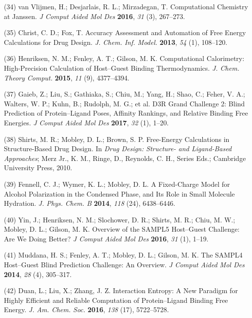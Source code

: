 \documentclass[11pt,notitlepage]{article}
\begin{document}
\leavevmode\hypertarget{ref-1FiDpP1LR}{}%
(34) van Vlijmen, H.; Desjarlais, R. L.; Mirzadegan, T. Computational
Chemistry at Janssen. \emph{J Comput Aided Mol Des} \textbf{2016},
\emph{31} (3), 267--273.

\leavevmode\hypertarget{ref-1BwXH3GFO}{}%
(35) Christ, C. D.; Fox, T. Accuracy Assessment and Automation of Free
Energy Calculations for Drug Design. \emph{J. Chem. Inf. Model.}
\textbf{2013}, \emph{54} (1), 108--120.

\leavevmode\hypertarget{ref-1935a9V0d}{}%
(36) Henriksen, N. M.; Fenley, A. T.; Gilson, M. K. Computational
Calorimetry: High-Precision Calculation of Host--Guest Binding
Thermodynamics. \emph{J. Chem. Theory Comput.} \textbf{2015}, \emph{11}
(9), 4377--4394.

\leavevmode\hypertarget{ref-LWd10vQy}{}%
(37) Gaieb, Z.; Liu, S.; Gathiaka, S.; Chiu, M.; Yang, H.; Shao, C.;
Feher, V. A.; Walters, W. P.; Kuhn, B.; Rudolph, M. G.; et al. D3R Grand
Challenge 2: Blind Prediction of Protein--Ligand Poses, Affinity
Rankings, and Relative Binding Free Energies. \emph{J Comput Aided Mol
Des} \textbf{2017}, \emph{32} (1), 1--20.

\leavevmode\hypertarget{ref-fC0t6Cy1}{}%
(38) Shirts, M. R.; Mobley, D. L.; Brown, S. P. Free-Energy Calculations
in Structure-Based Drug Design. In \emph{Drug Design: Structure- and
Ligand-Based Approaches}; Merz Jr., K. M., Ringe, D., Reynolds, C. H.,
Series Eds.; Cambridge University Press, 2010.

\leavevmode\hypertarget{ref-LOjcxYqt}{}%
(39) Fennell, C. J.; Wymer, K. L.; Mobley, D. L. A Fixed-Charge Model
for Alcohol Polarization in the Condensed Phase, and Its Role in Small
Molecule Hydration. \emph{J. Phys. Chem. B} \textbf{2014}, \emph{118}
(24), 6438--6446.

\leavevmode\hypertarget{ref-BGsUYQln}{}%
(40) Yin, J.; Henriksen, N. M.; Slochower, D. R.; Shirts, M. R.; Chiu,
M. W.; Mobley, D. L.; Gilson, M. K. Overview of the SAMPL5 Host--Guest
Challenge: Are We Doing Better? \emph{J Comput Aided Mol Des}
\textbf{2016}, \emph{31} (1), 1--19.

\leavevmode\hypertarget{ref-GA1AFcUw}{}%
(41) Muddana, H. S.; Fenley, A. T.; Mobley, D. L.; Gilson, M. K. The
SAMPL4 Host--Guest Blind Prediction Challenge: An Overview. \emph{J
Comput Aided Mol Des} \textbf{2014}, \emph{28} (4), 305--317.

\leavevmode\hypertarget{ref-gRfhPG7N}{}%
(42) Duan, L.; Liu, X.; Zhang, J. Z. Interaction Entropy: A New Paradigm
for Highly Efficient and Reliable Computation of Protein--Ligand Binding
Free Energy. \emph{J. Am. Chem. Soc.} \textbf{2016}, \emph{138} (17),
5722--5728.
\end{document}
